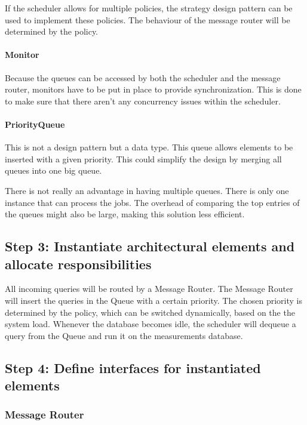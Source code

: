 \npar If the scheduler allows for multiple policies, the strategy design pattern
can be used to implement these policies. The behaviour of the message router
will be determined by the policy.

\paragraph{Monitor} 

\npar Because the queues can be accessed by both the scheduler and the message
router, monitors have to be put in place to provide synchronization. This is
done to make sure that there aren't any concurrency issues within the scheduler. 

\paragraph{PriorityQueue}

\npar This is not a design pattern but a data type. This queue allows elements
to be inserted with a given priority. This could simplify the design by merging
all queues into one big queue.

\npar There is not really an advantage in having multiple queues. There is only
one instance that can process the jobs. The overhead of comparing the top
entries of the queues might also be large, making this solution less efficient. 

\subsection{Step 3: Instantiate architectural elements and allocate responsibilities}
\label{add:it3/elements}

\npar All incoming queries will be routed by a Message Router. The Message
Router will insert the queries in the Queue with a certain priority. The chosen
priority is determined by the policy, which can be switched dynamically, based
on the the system load. Whenever the database becomes idle, the scheduler will
dequeue a query from the Queue and run it on the measurements database. 

\subsection{Step 4: Define interfaces for instantiated elements}
\label{add:it3/interfaces}

\subsubsection{Message Router}

